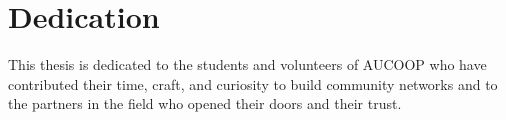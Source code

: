 \hypertarget{dedication}{%
\section{Dedication}\label{dedication}}

This thesis is dedicated to the students and volunteers of AUCOOP who
have contributed their time, craft, and curiosity to build community
networks and to the partners in the field who opened their doors and
their trust.

